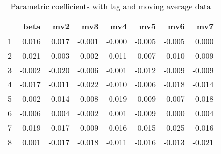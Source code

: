 \documentclass[a4paper, 12pt]{article}
\begin{document}
\begin{table}[h]
\centering
\caption{Parametric coefficients with lag and moving average data}
\begin{tabular}{rrrrrrrr}
  \hline
 & beta & mv2 & mv3 & mv4 & mv5 & mv6 & mv7 \\
  \hline
1 & 0.016 & 0.017 & -0.001 & -0.000 & -0.005 & -0.005 & 0.000 \\
  2 & -0.021 & -0.003 & 0.002 & -0.011 & -0.007 & -0.010 & -0.009 \\
  3 & -0.002 & -0.020 & -0.006 & -0.001 & -0.012 & -0.009 & -0.009 \\
  4 & -0.017 & -0.011 & -0.022 & -0.010 & -0.006 & -0.018 & -0.014 \\
  5 & -0.002 & -0.014 & -0.008 & -0.019 & -0.009 & -0.007 & -0.018 \\
  6 & -0.006 & 0.004 & -0.002 & 0.001 & -0.009 & 0.000 & 0.004 \\
  7 & -0.019 & -0.017 & -0.009 & -0.016 & -0.015 & -0.025 & -0.016 \\
  8 & 0.001 & -0.017 & -0.018 & -0.011 & -0.016 & -0.013 & -0.021 \\
   \hline
\end{tabular}
\end{table}
\clearpage
\end{document}
